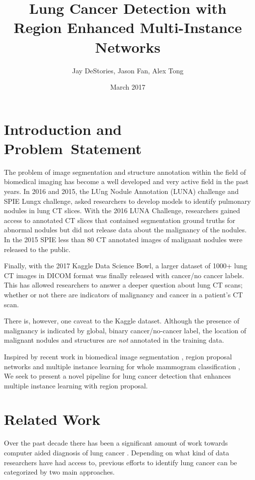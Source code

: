 \documentclass[twocolumn,10pt]{article}
\title{Lung Cancer Detection with \\Region Enhanced 
Multi-Instance Networks}
\author{Jay DeStories, Jason Fan, Alex Tong}
\date{March 2017}
\begin{document}
\maketitle
\section{Introduction and \\Problem~Statement}
The problem of image segmentation and structure annotation within the 
field of biomedical imaging has become a well developed and very active field in
the past years. In 2016 and 2015, the LUng Nodule Annotation (LUNA) challenge and 
SPIE Lungx challenge, asked researchers to develop models to identify pulmonary 
nodules in lung CT slices. With the 2016 LUNA Challenge, researchers gained access
to annotated CT slices that contained segmentation ground truths for abnormal 
nodules but did not release data about the malignancy of the nodules. 
In the 2015 SPIE less than 80 CT annotated images of malignant nodules were 
released to the public.

Finally, with the 2017 Kaggle Data Science Bowl, a larger dataset of
1000+ lung CT images in DICOM format was finally released with cancer/no cancer 
labels. This has allowed researchers to answer a deeper question about lung CT
scans; whether or not there are indicators of malignancy and cancer in a patient's
CT scan.

There is, however, one caveat to the Kaggle dataset. 
Although the presence of malignancy is indicated by global, binary 
cancer/no-cancer label, the location of malignant nodules and structures are
\textit{not} annotated in the training data.

Inspired by recent work in biomedical image segmentation
\cite{DBLP:journals/corr/ChristEETBBRAHD16}, region proposal 
networks and multiple instance learning for whole mammogram classification
\cite{Maron:1998:FML:302528.302753},
We seek to present a novel pipeline for lung cancer detection that enhances
multiple instance learning with region proposal.

\section{Related Work}

Over the past decade there has been a significant amount of work towards 
computer aided diagnosis of lung cancer \cite{cad_1998}. Depending on what kind
of data researchers have had access to, previous efforts to identify lung cancer
can be categorized by two main approaches. 
\end{document}
